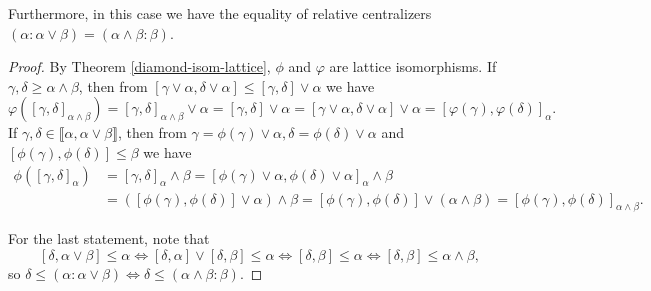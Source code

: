 \begin{appendices}
\begin{thm}
Furthermore, in this case we have the equality of relative centralizers $(\alpha:\alpha\vee\beta) = (\alpha\wedge\beta:\beta)$.
\end{thm}
\begin{proof} By Theorem \ref{diamond-isom-lattice}, $\phi$ and $\varphi$ are lattice isomorphisms. %
If $\gamma,\delta \ge \alpha\wedge \beta$, then from $[\gamma \vee \alpha, \delta \vee \alpha] \le [\gamma,\delta] \vee \alpha$ we have
\[
\varphi([\gamma,\delta]_{\alpha\wedge \beta}) = [\gamma,\delta]_{\alpha\wedge \beta} \vee \alpha = [\gamma,\delta]\vee \alpha = [\gamma \vee \alpha, \delta \vee \alpha] \vee \alpha = [\varphi(\gamma),\varphi(\delta)]_\alpha.
\]
If $\gamma,\delta \in \llbracket\alpha, \alpha\vee\beta\rrbracket$, then from $\gamma = \phi(\gamma) \vee \alpha, \delta = \phi(\delta) \vee \alpha$ and $[\phi(\gamma),\phi(\delta)] \le \beta$ we have
\begin{align*}
\phi([\gamma,\delta]_\alpha) &= [\gamma,\delta]_\alpha \wedge \beta = [\phi(\gamma)\vee \alpha, \phi(\delta) \vee \alpha]_\alpha \wedge \beta\\
&= ([\phi(\gamma),\phi(\delta)]\vee \alpha) \wedge \beta = [\phi(\gamma),\phi(\delta)]\vee (\alpha \wedge \beta) = [\phi(\gamma),\phi(\delta)]_{\alpha\wedge \beta}.
\end{align*}

For the last statement, note that
\[
[\delta,\alpha\vee\beta] \le \alpha \iff [\delta,\alpha]\vee[\delta,\beta] \le \alpha \iff [\delta,\beta] \le \alpha \iff [\delta,\beta] \le \alpha \wedge \beta,
\]
so $\delta \le (\alpha : \alpha\vee \beta) \iff \delta \le (\alpha \wedge \beta : \beta)$.
\end{proof}


\end{appendices}
